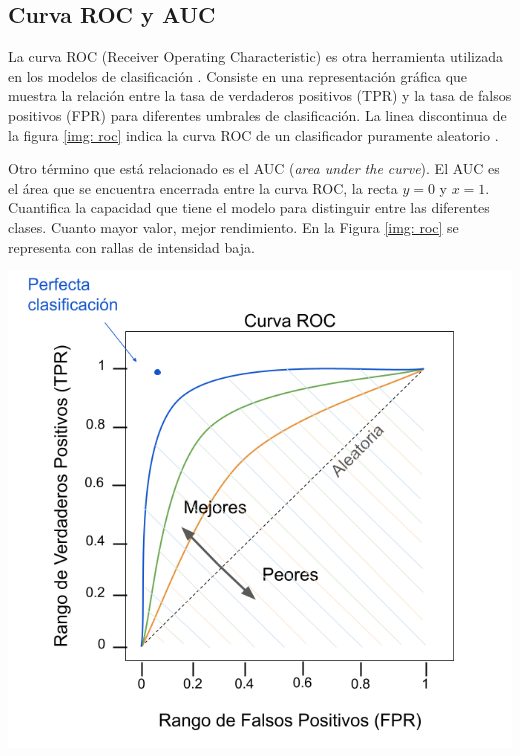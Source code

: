 \subsection{Curva ROC y AUC}

\begin{minipage}{0.5\textwidth}
La curva ROC (Receiver Operating Characteristic) es otra herramienta utilizada en los modelos de clasificación \citep{geron2022hands}. Consiste en una representación gráfica que muestra la relación entre la tasa de verdaderos positivos (TPR) y la tasa de falsos positivos (FPR) para diferentes umbrales de clasificación. La linea discontinua de la figura \ref{img: roc} indica la curva ROC de un clasificador puramente aleatorio \citep{geron2022hands}. 

\bigskip

Otro término que está relacionado es el AUC (\textit{area under the curve}). El AUC es el área que se encuentra encerrada entre la curva ROC, la recta $y = 0$ y $x = 1$. Cuantifica la capacidad que tiene el modelo para distinguir entre las diferentes clases. Cuanto mayor valor, mejor rendimiento. En la Figura \ref{img: roc} se representa con rallas de intensidad baja. 
\end{minipage}
\begin{minipage}{0.05\textwidth}
\textbf{ }
\end{minipage}
\begin{minipage}{0.4\textwidth}
	\includegraphics[width=1.15\textwidth]{img/roc.png}
	\label{img: roc}
\end{minipage}

